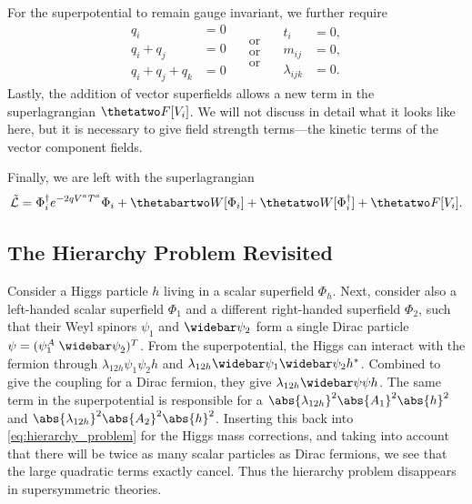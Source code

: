 For the superpotential to remain gauge invariant, we further require
\begin{subequations}
\label{eq:superpotential_charge_sum}
\begin{equation}
    \begin{split}
        q_i &= 0 \\
        q_i + q_j &= 0 \\
        q_i + q_j + q_k &= 0
    \end{split}
    \begin{split}
        \quad \text{or} \quad \\
        \quad \text{or} \quad \\
        \quad \text{or} \quad
    \end{split}
    \begin{split}
         t_i &= 0, \\
         m_{ij} &= 0, \\
         \lambda_{ijk} &= 0.
    \end{split}
\end{equation}
\end{subequations}
Lastly, the addition of vector superfields allows a new term in the superlagrangian $\thetatwo F[V_i]$. We will not discuss in detail what it looks like here, but it is necessary to give field strength terms---the kinetic terms of the vector component fields.

Finally, we are left with the superlagrangian
\begin{equation}\label{eq:general_susy_lagrangian}
    \tilde{\mathcal{L}} = \Phi_i^\dagger e^{-2qV^aT^a}\Phi_i + \thetabartwo W[\Phi_i] + \thetatwo W[\Phi_i^\dagger] + \thetatwo F[V_i].
\end{equation}


\subsection{The Hierarchy Problem Revisited}
Consider a Higgs particle $h$ living in a scalar superfield $\Phi_h$. Next, consider also a left-handed scalar superfield $\Phi_1$ and a different right-handed superfield $\Phi_2$, such that their Weyl spinors $\psi_1$ and $\widebar\psi_2$ form a single Dirac particle $\psi = (\psi_1^A \; \widebar\psi_{\dot2})^T$. From the superpotential, the Higgs can interact with the fermion through $\lambda_{12h}\psi_1\psi_2 h$ and $\lambda_{12h}\widebar\psi_1\widebar\psi_2 h^*$. Combined to give the coupling for a Dirac fermion, they give $\lambda_{12h}\widebar\psi\psi h$. The same term in the superpotential is responsible for a $\abs{\lambda_{12h}}^2 \abs{A_1}^2\abs{h}^2$ and $\abs{\lambda_{12h}}^2 \abs{A_2}^2\abs{h}^2$.
Inserting this back into \cref{eq:hierarchy_problem} for the Higgs mass corrections, and taking into account that there will be twice as many scalar particles as Dirac fermions, we see that the large quadratic terms exactly cancel.
Thus the hierarchy problem disappears in supersymmetric theories.


